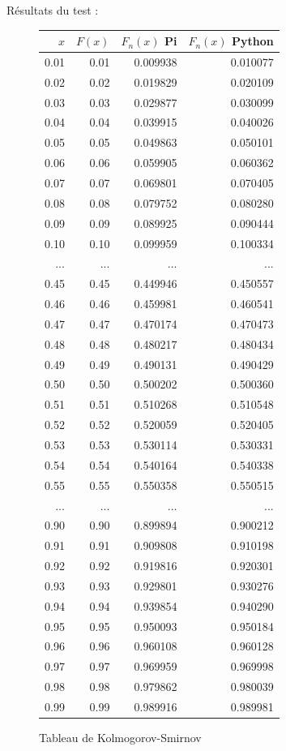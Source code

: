 \documentclass[10pt,a4paper]{article}
\begin{document}
	\newpage
	Résultats du test :
	\begin{figure}[h]
		\centering
		\begin{tabular}{|r|r|r|r|}
			\hline
			$x$ & $F(x)$ & $F_n(x)$ Pi & $F_n(x)$ Python\\
			\hline
			0.01 & 0.01 & 0.009938 & 0.010077\\
			0.02 & 0.02 & 0.019829 & 0.020109\\
			0.03 & 0.03 & 0.029877 & 0.030099\\
			0.04 & 0.04 & 0.039915 & 0.040026\\
			0.05 & 0.05 & 0.049863 & 0.050101\\
			0.06 & 0.06 & 0.059905 & 0.060362\\
			0.07 & 0.07 & 0.069801 & 0.070405\\
			0.08 & 0.08 & 0.079752 & 0.080280\\
			0.09 & 0.09 & 0.089925 & 0.090444\\
			0.10 & 0.10 & 0.099959 & 0.100334\\
			... & ... & ... & ...\\
			0.45 & 0.45 & 0.449946 & 0.450557\\
			0.46 & 0.46 & 0.459981 & 0.460541\\
			0.47 & 0.47 & 0.470174 & 0.470473\\
			0.48 & 0.48 & 0.480217 & 0.480434\\
			0.49 & 0.49 & 0.490131 & 0.490429\\
			0.50 & 0.50 & 0.500202 & 0.500360\\
			0.51 & 0.51 & 0.510268 & 0.510548\\
			0.52 & 0.52 & 0.520059 & 0.520405\\
			0.53 & 0.53 & 0.530114 & 0.530331\\
			0.54 & 0.54 & 0.540164 & 0.540338\\
			0.55 & 0.55 & 0.550358 & 0.550515\\
			... & ... & ... & ...\\
			0.90 & 0.90 & 0.899894 & 0.900212\\
			0.91 & 0.91 & 0.909808 & 0.910198\\
			0.92 & 0.92 & 0.919816 & 0.920301\\
			0.93 & 0.93 & 0.929801 & 0.930276\\
			0.94 & 0.94 & 0.939854 & 0.940290\\
			0.95 & 0.95 & 0.950093 & 0.950184\\
			0.96 & 0.96 & 0.960108 & 0.960128\\
			0.97 & 0.97 & 0.969959 & 0.969998\\
			0.98 & 0.98 & 0.979862 & 0.980039\\
			0.99 & 0.99 & 0.989916 & 0.989981\\
			\hline
		\end{tabular}
		\caption{Tableau de Kolmogorov-Smirnov}
	\end{figure}
	
\end{document}
